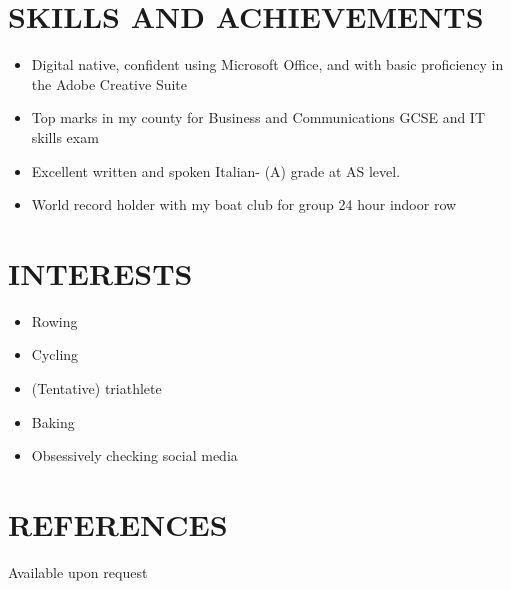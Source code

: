 \documentclass[]{friggeri-cv}
\begin{document}
\section{SKILLS AND ACHIEVEMENTS}

\begin{itemize}
	\item Digital native, confident using Microsoft Office, and with basic proficiency in the Adobe Creative Suite
	\item Top marks in my county for Business and Communications GCSE and IT skills exam 
	\item Excellent written and spoken Italian- (A) grade at AS level. 
	\item World record holder with my boat club for group 24 hour indoor row
\end{itemize}

\section{INTERESTS}

\begin{itemize}
	\item Rowing
	\item Cycling
	\item (Tentative) triathlete 
	\item Baking
	\item Obsessively checking social media
\end{itemize}

\section{REFERENCES}

Available upon request
\end{document}
